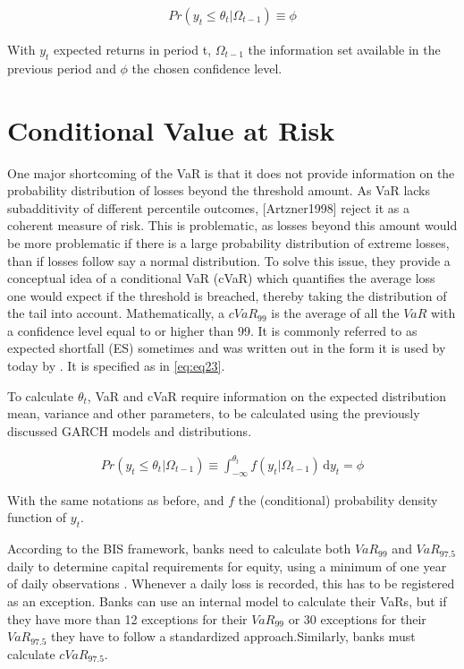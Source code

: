 \documentclass[a4paper, twoside]{templates/ociamthesis}
\begin{document}
\begin{align}
Pr(y_t \le \theta_t | \Omega_{t-1}) \equiv \phi
 \label{eq:eq22}
\end{align}

With \(y_t\) expected returns in period t, \(\Omega_{t-1}\) the information set available in the previous period and \(\phi\) the chosen confidence level.

\hypertarget{conditional-value-at-risk}{%
\section{Conditional Value at Risk}\label{conditional-value-at-risk}}

One major shortcoming of the VaR is that it does not provide information on the probability distribution of losses beyond the threshold amount. As VaR lacks subadditivity of different percentile outcomes, {[}Artzner1998{]} reject it as a coherent measure of risk. This is problematic, as losses beyond this amount would be more problematic if there is a large probability distribution of extreme losses, than if losses follow say a normal distribution. To solve this issue, they provide a conceptual idea of a conditional VaR (cVaR) which quantifies the average loss one would expect if the threshold is breached, thereby taking the distribution of the tail into account. Mathematically, a \(cVaR_{99}\) is the average of all the \(VaR\) with a confidence level equal to or higher than 99. It is commonly referred to as expected shortfall (ES) sometimes and was written out in the form it is used by today by \autocite{bertsimas2004}. It is specified as in \eqref{eq:eq23}.

To calculate \(\theta_t\), VaR and cVaR require information on the expected distribution mean, variance and other parameters, to be calculated using the previously discussed GARCH models and distributions.

\begin{align}
Pr(y_t \le \theta_t | \Omega_{t-1}) \equiv \int_{-\infty}^{\theta_t} \! f(y_t | \Omega_{t-1}) \, \mathrm{d}y_t = \phi
 \label{eq:eq23}
\end{align}

With the same notations as before, and \(f\) the (conditional) probability density function of \(y_t\).

According to the BIS framework, banks need to calculate both \(VaR_{99}\) and \(VaR_{97.5}\) daily to determine capital requirements for equity, using a minimum of one year of daily observations \autocite{baselcommitteeonbankingsupervision2016}. Whenever a daily loss is recorded, this has to be registered as an exception. Banks can use an internal model to calculate their VaRs, but if they have more than 12 exceptions for their \(VaR_{99}\) or 30 exceptions for their \(VaR_{97.5}\) they have to follow a standardized approach.Similarly, banks must calculate \(cVaR_{97.5}\).
\end{document}
